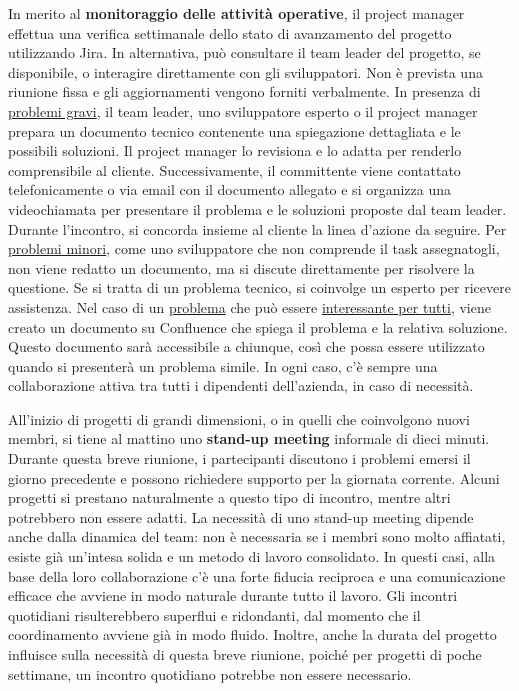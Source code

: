         In merito al \textbf{monitoraggio delle attività operative}, il project manager effettua una verifica settimanale dello stato di avanzamento del progetto utilizzando Jira.
        In alternativa, può consultare il team leader del progetto, se disponibile, o interagire direttamente con gli sviluppatori. Non è prevista una riunione fissa e gli
        aggiornamenti vengono forniti verbalmente. In presenza di \underline{problemi gravi}, il team leader, uno sviluppatore esperto o il project manager prepara un
        documento tecnico contenente una spiegazione dettagliata e le possibili soluzioni. Il project manager lo revisiona e lo adatta per renderlo comprensibile
        al cliente. Successivamente, il committente viene contattato telefonicamente o via email con il documento allegato e si organizza una videochiamata per
        presentare il problema e le soluzioni proposte dal team leader. Durante l'incontro, si concorda insieme al cliente la linea d'azione da seguire.
        Per \underline{problemi minori}, come uno sviluppatore che non comprende il task assegnatogli, non viene redatto un documento, ma si discute direttamente per
        risolvere la questione. Se si tratta di un problema tecnico, si coinvolge un esperto per ricevere assistenza. Nel caso di un \underline{problema} che può essere 
        \underline{interessante per tutti}, viene
        creato un documento su Confluence che spiega il problema e la relativa soluzione. Questo documento sarà accessibile a chiunque, così che possa essere utilizzato quando si presenterà un problema simile.
        In ogni caso, c'è sempre una collaborazione attiva tra tutti i dipendenti dell’azienda, in caso di necessità.

        All'inizio di progetti di grandi dimensioni, o in quelli che coinvolgono nuovi membri, si tiene al mattino uno \textbf{stand-up meeting} informale di dieci minuti.
        Durante questa breve riunione, i partecipanti discutono i problemi emersi il giorno precedente e possono richiedere supporto per la giornata corrente. Alcuni
        progetti si prestano naturalmente a questo tipo di incontro, mentre altri potrebbero non essere adatti.
        La necessità di uno stand-up meeting dipende anche dalla dinamica del team: non è necessaria se i membri sono molto affiatati, esiste già un'intesa
        solida e un metodo di lavoro consolidato. In questi casi, alla base della loro collaborazione c’è una forte fiducia reciproca e una comunicazione efficace
        che avviene in modo naturale durante tutto il lavoro. Gli incontri quotidiani risulterebbero superflui e ridondanti, dal momento che il
        coordinamento avviene già in modo fluido. Inoltre, anche la durata del progetto influisce
        sulla necessità di questa breve riunione, poiché per progetti di poche settimane, un incontro quotidiano potrebbe non essere necessario.

